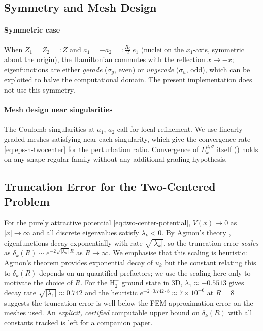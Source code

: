 \documentclass[11pt]{article}
\theoremstyle{plain}
\theoremstyle{definition}
\theoremstyle{remark}
\begin{document}
\subsection{Symmetry and Mesh Design}
\label{subsec:twocenter-symmetry}

\paragraph{Symmetric case}
When $Z_1 = Z_2 =: Z$ and $a_1 = -a_2 =: \frac{R_0}{2}\,e_1$
(nuclei on the $x_1$-axis, symmetric about the origin), the
Hamiltonian commutes with the reflection $x \mapsto -x$; eigenfunctions
are either \emph{gerade} ($\sigma_g$, even) or \emph{ungerade}
($\sigma_u$, odd), which can be exploited to halve the computational
domain.  The present implementation does not use this symmetry.

\paragraph{Mesh design near singularities}
The Coulomb singularities at $a_1$, $a_2$ call for local refinement.
We use linearly graded meshes satisfying  near
each singularity, which give the convergence rate
\eqref{eq:eps-h-twocenter} for the perturbation ratio.
Convergence of $L_k^{\mu,\sigma}$ itself ()
holds on any shape-regular family without any additional grading
hypothesis.

\subsection{Truncation Error for the Two-Centered Problem}
\label{subsec:twocenter-truncation}

For the purely attractive potential \eqref{eq:two-center-potential},
$V(x) \to 0$ as $|x| \to \infty$ and all discrete eigenvalues satisfy
$\lambda_k < 0$.  By Agmon's theory \cite{Agmon1982}, eigenfunctions
decay exponentially with rate $\sqrt{|\lambda_k|}$, so the truncation
error \emph{scales} as $\delta_k(R)\sim e^{-2\sqrt{|\lambda_k|}\,R}$
as $R\to\infty$. We emphasise that this scaling is heuristic: Agmon's
theorem provides exponential decay of $u_k$ but the constant relating
this to $\delta_k(R)$ depends on un-quantified prefactors; we use the
scaling here only to motivate the choice of $R$. For the
$\mathrm{H}_2^+$ ground state in 3D, $\lambda_1\approx-0.5513$ gives
decay rate $\sqrt{|\lambda_1|}\approx 0.742$ and the heuristic
$e^{-2\cdot 0.742\cdot 8}\approx 7\times 10^{-6}$ at $R=8$ suggests
the truncation error is well below the FEM approximation error on the
meshes used. An \emph{explicit, certified} computable upper bound on
$\delta_k(R)$ with all constants tracked is left for a companion paper.
\end{document}
